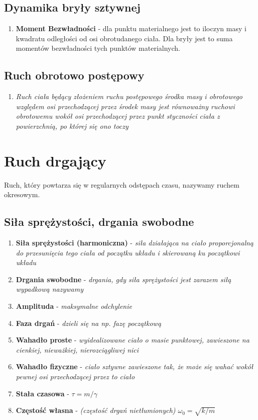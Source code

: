 \documentclass[12pt,twoside,a4paper]{book}
\begin{document}
\section{Dynamika bryły sztywnej}
\begin{enumerate}[label=(\alph*)]
\item\textbf{Moment Bezwładności} - dla punktu materialnego jest to iloczyn masy i kwadratu odległości od osi obrotudanego ciała. Dla bryły jest to suma momentów bezwładności tych punktów materialnych.\textit{}
\end{enumerate}
\section{Ruch obrotowo postępowy}
\begin{enumerate}[label=(\alph*)]
\item\textit{Ruch ciała będący złożeniem ruchu postępowego środka masy i obrotowego
względem osi przechodzącej przez środek masy jest równoważny ruchowi
obrotowemu wokół osi przechodzącej przez punkt styczności ciała z powierzchnią,
po której się ono toczy}
\end{enumerate}

\chapter{Ruch drgający}
Ruch, który powtarza się w regularnych odstępach czasu, nazywamy ruchem okresowym.
\section{Siła sprężystości, drgania swobodne}
\begin{enumerate}[label=(\alph*)]
\item\textbf{Siła sprężystości (harmoniczna)} - \textit{siła działająca na ciało proporcjonalną
do przesunięcia tego ciała od początku układu i skierowaną ku początkowi układu}
\item\textbf{Drgania swobodne} - \textit{drgania, gdy siła sprężystości jest zarazem siłą wypadkową nazywamy}
\item\textbf{Amplituda} - \textit{maksymalne odchylenie}
\item\textbf{Faza drgań} - \textit{dzieli się na np. fazę początkową}
\item\textbf{Wahadło proste} - \textit{wyidealizowane ciało o masie punktowej,
zawieszone na cienkiej, nieważkiej, nierozciągliwej nici}
\item\textbf{Wahadło fizyczne} - \textit{ciało sztywne zawieszone tak, że może się wahać
wokół pewnej osi przechodzącej przez to ciało}
\item\textbf{Stała czasowa} - \textit{$\tau = m / \gamma$}
\item\textbf{Częstość własna} - \textit{(częstość drgań nietłumionych)  $\omega_{0} = \sqrt{k/m}$}
\end{enumerate}
\end{document}
